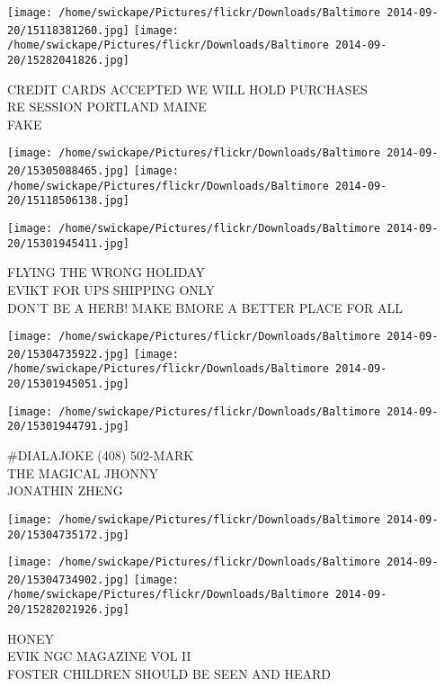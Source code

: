 \documentclass[10pt,letterpaper]{article}
\begin{document}
\vspace{0.25in}
\texttt{[image: /home/swickape/Pictures/flickr/Downloads/Baltimore 2014-09-20/15118381260.jpg]}
\texttt{[image: /home/swickape/Pictures/flickr/Downloads/Baltimore 2014-09-20/15282041826.jpg]}

CREDIT CARDS ACCEPTED WE WILL HOLD PURCHASES\\
RE SESSION PORTLAND MAINE\\
FAKE\\
\pagebreak

\texttt{[image: /home/swickape/Pictures/flickr/Downloads/Baltimore 2014-09-20/15305088465.jpg]}
\texttt{[image: /home/swickape/Pictures/flickr/Downloads/Baltimore 2014-09-20/15118506138.jpg]}

\vspace{0.25in}
\texttt{[image: /home/swickape/Pictures/flickr/Downloads/Baltimore 2014-09-20/15301945411.jpg]}

FLYING THE WRONG HOLIDAY\\
EVIKT FOR UPS SHIPPING ONLY\\
DON'T BE A HERB!  MAKE BMORE A BETTER PLACE FOR ALL\\
\pagebreak

\texttt{[image: /home/swickape/Pictures/flickr/Downloads/Baltimore 2014-09-20/15304735922.jpg]}
\texttt{[image: /home/swickape/Pictures/flickr/Downloads/Baltimore 2014-09-20/15301945051.jpg]}

\vspace{0.25in}
\texttt{[image: /home/swickape/Pictures/flickr/Downloads/Baltimore 2014-09-20/15301944791.jpg]}

\#DIALAJOKE (408) 502{-}MARK\\
THE MAGICAL JHONNY\\
JONATHIN ZHENG\\
\pagebreak

\texttt{[image: /home/swickape/Pictures/flickr/Downloads/Baltimore 2014-09-20/15304735172.jpg]}

\vspace{0.25in}
\texttt{[image: /home/swickape/Pictures/flickr/Downloads/Baltimore 2014-09-20/15304734902.jpg]}
\texttt{[image: /home/swickape/Pictures/flickr/Downloads/Baltimore 2014-09-20/15282021926.jpg]}

HONEY\\
EVIK NGC MAGAZINE VOL II\\
FOSTER CHILDREN SHOULD BE SEEN AND HEARD\\
\pagebreak
\end{document}
